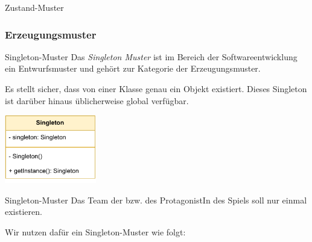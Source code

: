\begin{example}{Zustand-Muster}
    

    

    
\end{example}

\subsubsection{Erzeugungsmuster}

\begin{defi}{Singleton-Muster}
    Das \emph{Singleton Muster} ist im Bereich der Softwareentwicklung ein Entwurfsmuster und gehört zur Kategorie der Erzeugungsmuster.

    Es stellt sicher, dass von einer Klasse genau ein Objekt existiert.
    Dieses Singleton ist darüber hinaus üblicherweise global verfügbar.

    \begin{center}
        \includegraphics[width=0.3\textwidth]{includes/figures/defi_singleton.pdf}
    \end{center}
\end{defi}

\begin{example}{Singleton-Muster}
    Das Team der bzw. des ProtagonistIn des Spiels soll nur einmal existieren.

    Wir nutzen dafür ein Singleton-Muster wie folgt:
    

    
\end{example}


